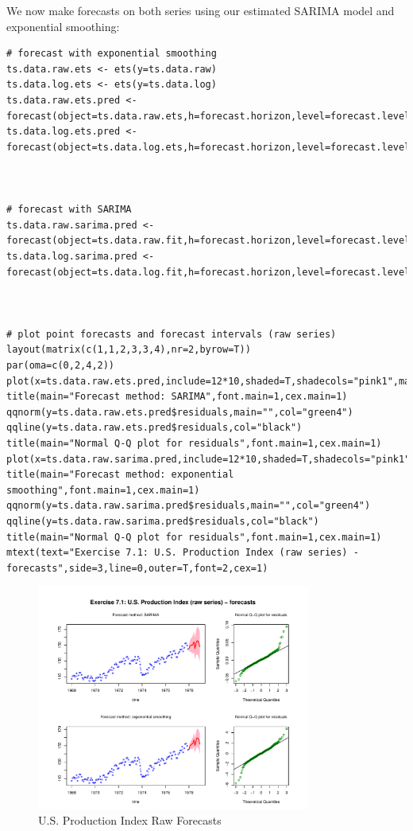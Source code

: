 We now make forecasts on both series using our estimated SARIMA model and exponential smoothing:
\begin{lstlisting}
# forecast with exponential smoothing
ts.data.raw.ets <- ets(y=ts.data.raw)
ts.data.log.ets <- ets(y=ts.data.log)
ts.data.raw.ets.pred <- forecast(object=ts.data.raw.ets,h=forecast.horizon,level=forecast.level)
ts.data.log.ets.pred <- forecast(object=ts.data.log.ets,h=forecast.horizon,level=forecast.level)



# forecast with SARIMA
ts.data.raw.sarima.pred <- forecast(object=ts.data.raw.fit,h=forecast.horizon,level=forecast.level)
ts.data.log.sarima.pred <- forecast(object=ts.data.log.fit,h=forecast.horizon,level=forecast.level)



# plot point forecasts and forecast intervals (raw series)
layout(matrix(c(1,1,2,3,3,4),nr=2,byrow=T))
par(oma=c(0,2,4,2))
plot(x=ts.data.raw.ets.pred,include=12*10,shaded=T,shadecols="pink1",main="",col="blue",fcol="red",type="b",xlab="time")
title(main="Forecast method: SARIMA",font.main=1,cex.main=1)
qqnorm(y=ts.data.raw.ets.pred$residuals,main="",col="green4")
qqline(y=ts.data.raw.ets.pred$residuals,col="black")
title(main="Normal Q-Q plot for residuals",font.main=1,cex.main=1)
plot(x=ts.data.raw.sarima.pred,include=12*10,shaded=T,shadecols="pink1",main="",col="blue",fcol="red",type="b",xlab="time")
title(main="Forecast method: exponential smoothing",font.main=1,cex.main=1)
qqnorm(y=ts.data.raw.sarima.pred$residuals,main="",col="green4")
qqline(y=ts.data.raw.sarima.pred$residuals,col="black")
title(main="Normal Q-Q plot for residuals",font.main=1,cex.main=1)
mtext(text="Exercise 7.1: U.S. Production Index (raw series) - forecasts",side=3,line=0,outer=T,font=2,cex=1)
\end{lstlisting}

\begin{figure}[H]
\centering
\includegraphics[width=0.8\textwidth]{plots/UsProdRawForecast.pdf}
\caption{U.S. Production Index Raw Forecasts}
\end{figure}


